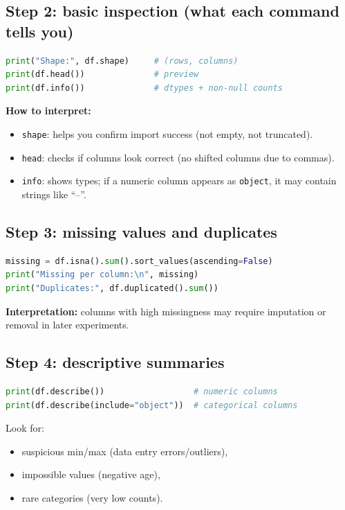 \documentclass[11pt]{article}
\begin{document}
\subsection{Step 2: basic inspection (what each command tells you)}
\begin{lstlisting}[language=Python]
print("Shape:", df.shape)     # (rows, columns)
print(df.head())              # preview
print(df.info())              # dtypes + non-null counts
\end{lstlisting}
\textbf{How to interpret:}
\begin{itemize}[leftmargin=*]
  \item \texttt{shape}: helps you confirm import success (not empty, not truncated).
  \item \texttt{head}: checks if columns look correct (no shifted columns due to commas).
  \item \texttt{info}: shows types; if a numeric column appears as \texttt{object}, it may contain strings like ``--''.
\end{itemize}

\subsection{Step 3: missing values and duplicates}
\begin{lstlisting}[language=Python]
missing = df.isna().sum().sort_values(ascending=False)
print("Missing per column:\n", missing)
print("Duplicates:", df.duplicated().sum())
\end{lstlisting}
\textbf{Interpretation:} columns with high missingness may require imputation or removal in later experiments.

\subsection{Step 4: descriptive summaries}
\begin{lstlisting}[language=Python]
print(df.describe())                  # numeric columns
print(df.describe(include="object"))  # categorical columns
\end{lstlisting}
Look for:
\begin{itemize}[leftmargin=*]
  \item suspicious min/max (data entry errors/outliers),
  \item impossible values (negative age),
  \item rare categories (very low counts).
\end{itemize}
\end{document}

